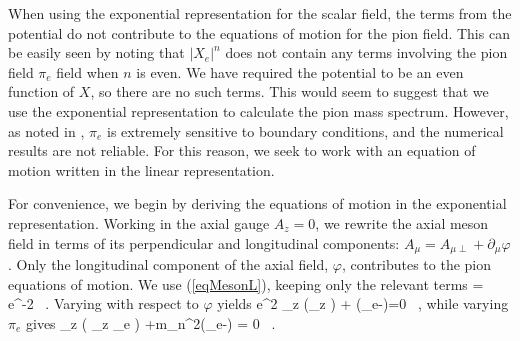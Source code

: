 When using the exponential representation for the scalar field, the terms from the potential do not contribute to the equations of motion for the pion field.
This can be easily seen by noting that $|X_e|^n$ does not contain any terms involving the pion field $\pi_e$ field when $n$ is even. 
We have required the potential to be an even function of $X$, so there are no such terms.
This would seem to suggest that we use the exponential representation to calculate the pion mass spectrum.
However, as noted in \cite{bartz-pions}, $\pi_e$ is extremely sensitive to boundary conditions, and the numerical results are not reliable.
For this reason, we seek to work with an equation of motion written in the linear representation.

For convenience, we begin by deriving the equations of motion in the exponential representation.
Working in the axial gauge $A_z = 0$, we rewrite the axial meson field in terms of its perpendicular and longitudinal components: $A_\mu = A_{\mu\perp} +\partial_\mu \varphi$.
Only the longitudinal component of the axial field, $\varphi$, contributes to the pion equations of motion.
We use (\ref{eqMesonL}), keeping only the relevant terms
\be
\cL = e^{-2\Phi}   \, .
\ee
Varying with respect to $\varphi$ yields
\be
e^{2\Phi} \partial_z \left(\partial_z \varphi \right) + (\pi_e-\varphi)=0 \, ,
\ee
while varying $\pi_e$ gives
\be
{}\partial_z \left( \partial_z \pi_e \right) +m_n^2(\pi_e-\varphi) = 0 \, .
\ee

